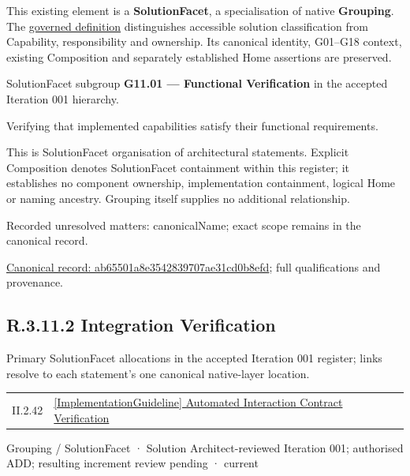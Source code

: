 This existing element is a \textbf{SolutionFacet}, a specialisation of native
\textbf{Grouping}. The \href{\detokenize{../../../../../../../governance/continuum-representation.md#solutionfacet-classification--1119-candidate}}{governed definition}
distinguishes accessible solution classification from Capability, responsibility
and ownership. Its canonical identity, G01–G18 context, existing Composition
and separately established Home assertions are preserved.



SolutionFacet subgroup \textbf{G11.01 — Functional Verification} in the accepted Iteration 001 hierarchy.



Verifying that implemented capabilities satisfy their functional requirements.



This is SolutionFacet organisation of architectural statements. Explicit Composition denotes SolutionFacet containment within this register; it establishes no component ownership, implementation containment, logical Home or naming ancestry. Grouping itself supplies no additional relationship.


{\small Recorded unresolved matters: canonicalName; exact scope remains in the canonical record.}\par
{\footnotesize \href{../../../../../../../continuum/grouping/ab65501a8e3542839707ae31cd0b8efd.md}{Canonical record: ab65501a8e3542839707ae31cd0b8efd}; full qualifications and provenance.}\par
\subsection*{R.3.11.2 Integration Verification}
\label{navigation:R.3.11.2}

Primary SolutionFacet allocations in the accepted Iteration 001 register; links resolve to each statement’s one canonical native-layer location.\par
\begin{longtable}{p{.22\linewidth}p{.73\linewidth}}
II.2.42 & \hyperref[element:a6c8cc8f5647461cb210f88ced90cc57]{[ImplementationGuideline] Automated Interaction Contract Verification} \\
\end{longtable}
\label{element:e8c7f8a36ff248cd9115d7a382324808}
{\small Grouping / SolutionFacet · Solution Architect-reviewed Iteration 001; authorised ADD; resulting increment review pending · current}\par

